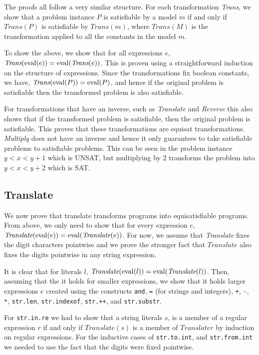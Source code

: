 The proofs all follow a very similar structure. For each transformation
\textit{Trans}, we show that a problem instance $P$ is satisfiable by a model $m$
if and only if $\textit{Trans}(P)$ is satisfiable by $\textit{Trans}(m)$, where
$\textit{Trans}(M)$ is the transformation applied to all the constants in the
model $m$.

To show the above, we show that for all expressions $e$, $\textit{Trans}(\operatorname{eval}
(e)) = \operatorname{eval} (\textit{Trans}(e))$. This is proven using a straightforward
induction on the structure of expressions. Since the transformations fix
boolean constants, we have, $\textit{Trans}(\operatorname{eval} (P)) = \operatorname{eval} (P)$, and hence
if the original problem is satisfiable then the transformed problem is also
satisfiable.

For transformations that have an inverse, such as \textit{Translate}
and \textit{Reverse} this also shows that if the transformed problem is
satisfiable, then the original problem is satisfiable. This proves that these
transformations are equisat transformations. \textit{Multiply} does not have an
inverse and hence it only guarantees to take satisfiable problems to satisfiable
problems. This can be seen in the problem instance $y<x<y+1$ which is UNSAT, but
multiplying by 2 transforms the problem into $y<x<y+2$ which is SAT.

\subsection{Translate}
We now prove that translate transforms programs into equisatisfiable
programs. From above, we only need to show that for every expression $e$,
$\textit{Translate}(\operatorname{eval} (e)) = \operatorname{eval} (\textit{Translate}(e))$. For now, we
assume that \textit{Translate} fixes the digit characters pointwise and we prove
the stronger fact that $\textit{Translate}$ also fixes the digits pointwise in
any string expression.

It is clear that for literals $l$, $\textit{Translate}(\operatorname{eval} (l)) = \operatorname{eval}
(\textit{Translate}(l))$. Then, assuming that the it holds for smaller
expressions, we show that it holds larger expressions $e$ created using the
constructs \texttt{and}, \texttt{=} (for strings and integers), \texttt{+},
\texttt{-}, \texttt{*}, \texttt{str.len}, \texttt{str.indexof}, \texttt{str.++},
and \texttt{str.substr}.

For \texttt{str.in.re} we had to show that a string literals $s$, is a member of
a regular expression $r$ if and only if $\textit{Translate}(s)$ is a member of
$\textit{Translate}{r}$ by induction on regular expressions. For the inductive
cases of \texttt{str.to.int}, and \texttt{str.from.int} we needed to use the
fact that the digits were fixed pointwise.

